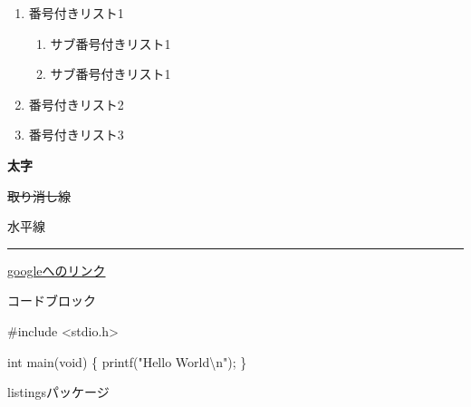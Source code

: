 \documentclass[
]{ltjarticle}
\newenvironment{Shaded}{}{}
\newcommand{\DataTypeTok}[1]{\textcolor[rgb]{0.56,0.13,0.00}{#1}}
\newcommand{\ImportTok}[1]{#1}
\newcommand{\NormalTok}[1]{#1}
\newcommand{\PreprocessorTok}[1]{\textcolor[rgb]{0.74,0.48,0.00}{#1}}
\newcommand{\SpecialCharTok}[1]{\textcolor[rgb]{0.25,0.44,0.63}{#1}}
\newcommand{\StringTok}[1]{\textcolor[rgb]{0.25,0.44,0.63}{#1}}
\providecommand{\tightlist}{%
  \setlength{\itemsep}{0pt}\setlength{\parskip}{0pt}}
\begin{document}
\begin{enumerate}
\def\labelenumi{\arabic{enumi}.}
\tightlist
\item
  番号付きリスト1

  \begin{enumerate}
  \def\labelenumii{\arabic{enumii}.}
  \tightlist
  \item
    サブ番号付きリスト1
  \item
    サブ番号付きリスト1
  \end{enumerate}
\item
  番号付きリスト2
\item
  番号付きリスト3
\end{enumerate}

\textbf{太字}

\sout{取り消し線}

水平線

\begin{center}\rule{0.5\linewidth}{\linethickness}\end{center}

\href{https://google.com}{googleへのリンク}

コードブロック

\begin{Shaded}
\begin{Highlighting}[]
\PreprocessorTok{#include }\ImportTok{<stdio.h>}

\DataTypeTok{int}\NormalTok{ main(}\DataTypeTok{void}\NormalTok{) \{}
\NormalTok{    printf(}\StringTok{"Hello World}\SpecialCharTok{\textbackslash{}n}\StringTok{"}\NormalTok{);}
\NormalTok{\}}
\end{Highlighting}
\end{Shaded}

listingsパッケージ


\end{document}
